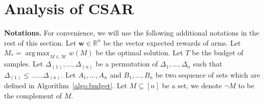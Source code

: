 \documentclass{article}
\newcommand{\junk}[1]{}
\newcommand{\AlgorithmBud}{{\small \textsf{CSAR}}\xspace}
\newcommand{\Problem}{{CPE}\xspace}
\newcommand{\M}{\mathcal M}
\newcommand{\del}{\backslash}
\newcommand{\RR}{\mathbb R}
\DeclareMathOperator*{\argmax}{arg\,max}
\newcommand{\barlog}{\tilde{\log}}
\renewcommand{\vec}[1]{\boldsymbol{#1}}
\begin{document}

\section{Analysis of \AlgorithmBud}


\textbf{Notations.}
For convenience, we will use the following additional notations in the rest of this section.
Let $\vec w \in \RR^n$ be the vector expected rewards of arms.
Let $M_* = \argmax_{M\in \M} w(M)$ be the optimal solution.
Let $T$ be the budget of samples.
Let $\Delta_{(1)},\ldots,\Delta_{(n)}$ be a permutation of $\Delta_1,\ldots,\Delta_n$ such that
$\Delta_{(1)} \le \ldots \ldots \Delta_{(n)}$.
Let $A_1,\ldots,A_n$ and $B_1,\ldots, B_n$ be two sequence of sets which are defined in Algorithm~\ref{algo:budget}.
Let $M\subseteq [n]$ be a set, we denote $\neg M$ to be the complement of $M$.


\junk{
\begin{lemma}
For each phase $t>0$ and each active arm $e\in [n] \del (A_t \cup B_t)$ of phase $t$, 
the arm $e$ must be pulled for at least $\tilde T_t$ times by Algorithm~X during phases $1,\ldots,t$, where $\tilde T$ is given by
\begin{equation}
\label{eq:define-tilde-t}
\tilde T_t = \left\lceil \frac{T-n}{\barlog(n)(n-t+1)} \right\rceil.
\end{equation}
\label{lemma:fbudget:samples}
\end{lemma}

\begin{proof}
Consider an arbitrary phase $t\in [n]$ and an arbitrary active arm $e\in [n] \del (A_t\cup B_t)$ of phase $t$.
Then, we can compute the number of pulls of arm $e$ as follows
\begin{equation}
\end{equation}
\end{proof}
}
\end{document}
